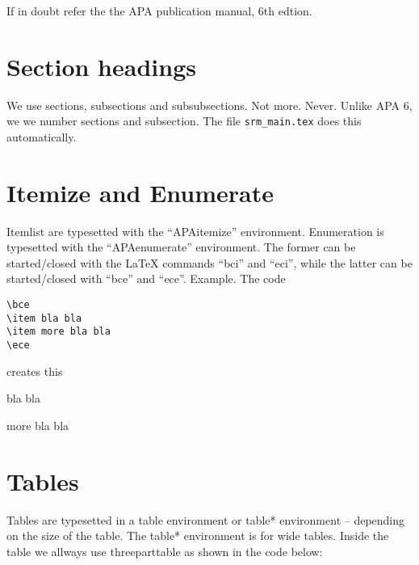If in doubt  refer the the APA publication manual, 6th edtion.


\section{Section headings}

We use sections, subsections and subsubsections. Not
more. Never. Unlike APA 6, we we number sections and subsection. The
file \texttt{srm\_main.tex} does this automatically.

\section{Itemize and Enumerate}


Itemlist are typesetted with the ``APAitemize''
environment. Enumeration is typesetted with the ``APAenumerate''
environment. The former can be started/closed with the LaTeX commands
``bci'' and ``eci'', while the latter can be started/closed with
``bce'' and ``ece''. Example. The code

\begin{scriptsize}
\begin{verbatim}
\bce
\item bla bla
\item more bla bla
\ece
\end{verbatim}
\end{scriptsize}

creates this

\bce
\item bla bla
\item more bla bla
\ece

\section{Tables}

Tables are typesetted in a table environment or table* environment --
depending on the size of the table. The table* environment is for wide
tables. Inside the table we allways use threeparttable as shown in the
code below:

